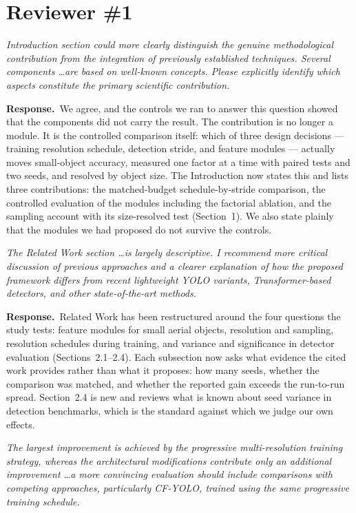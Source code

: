 \documentclass[11pt, a4paper]{article}
\newcommand{\point}[1]{\medskip\noindent\textit{#1}\par}
\newcommand{\reply}{\textbf{Response.}\ }
\begin{document}
\section*{Reviewer \#1}

\point{Introduction section could more clearly distinguish the genuine
methodological contribution from the integration of previously established
techniques. Several components \dots are based on well-known concepts. Please
explicitly identify which aspects constitute the primary scientific
contribution.}

\reply We agree, and the controls we ran to answer this question showed that the
components did not carry the result. The contribution is no longer a module. It
is the controlled comparison itself: which of three design decisions --- training
resolution schedule, detection stride, and feature modules --- actually moves
small-object accuracy, measured one factor at a time with paired tests and two
seeds, and resolved by object size. The Introduction now states this and lists
three contributions: the matched-budget schedule-by-stride comparison, the
controlled evaluation of the modules including the factorial ablation, and the
sampling account with its size-resolved test (Section~1). We also state plainly
that the modules we had proposed do not survive the controls.

\point{The Related Work section \dots is largely descriptive. I recommend more
critical discussion of previous approaches and a clearer explanation of how the
proposed framework differs from recent lightweight YOLO variants,
Transformer-based detectors, and other state-of-the-art methods.}

\reply Related Work has been restructured around the four questions the study
tests: feature modules for small aerial objects, resolution and sampling,
resolution schedules during training, and variance and significance in detector
evaluation (Sections~2.1--2.4). Each subsection now asks what evidence the cited
work provides rather than what it proposes: how many seeds, whether the
comparison was matched, and whether the reported gain exceeds the run-to-run
spread. Section~2.4 is new and reviews what is known about seed variance in
detection benchmarks, which is the standard against which we judge our own
effects.

\point{The largest improvement is achieved by the progressive multi-resolution
training strategy, whereas the architectural modifications contribute only an
additional improvement \dots a more convincing evaluation should include
comparisons with competing approaches, particularly CF-YOLO, trained using the
same progressive training schedule.}
\end{document}
